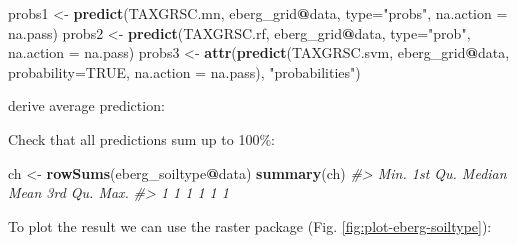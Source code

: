 \documentclass[graybox,natbib,nospthms,UStrade]{svmono}
\newenvironment{Shaded}{\begin{snugshade}}{\end{snugshade}}
\newcommand{\CommentTok}[1]{\textcolor[rgb]{0.37,0.37,0.37}{\textit{#1}}}
\newcommand{\DataTypeTok}[1]{\textcolor[rgb]{0.27,0.27,0.27}{#1}}
\newcommand{\KeywordTok}[1]{\textcolor[rgb]{0.27,0.27,0.27}{\textbf{#1}}}
\newcommand{\NormalTok}[1]{#1}
\newcommand{\OperatorTok}[1]{\textcolor[rgb]{0.43,0.43,0.43}{\textbf{#1}}}
\newcommand{\OtherTok}[1]{\textcolor[rgb]{0.37,0.37,0.37}{#1}}
\newcommand{\StringTok}[1]{\textcolor[rgb]{0.5,0.5,0.5}{#1}}
\begin{document}
\begin{Shaded}
\begin{Highlighting}[]
\NormalTok{probs1 <-}\StringTok{ }\KeywordTok{predict}\NormalTok{(TAXGRSC.mn, eberg_grid}\OperatorTok{@}\NormalTok{data, }\DataTypeTok{type=}\StringTok{"probs"}\NormalTok{, }\DataTypeTok{na.action =}\NormalTok{ na.pass) }
\NormalTok{probs2 <-}\StringTok{ }\KeywordTok{predict}\NormalTok{(TAXGRSC.rf, eberg_grid}\OperatorTok{@}\NormalTok{data, }\DataTypeTok{type=}\StringTok{"prob"}\NormalTok{, }\DataTypeTok{na.action =}\NormalTok{ na.pass)}
\NormalTok{probs3 <-}\StringTok{ }\KeywordTok{attr}\NormalTok{(}\KeywordTok{predict}\NormalTok{(TAXGRSC.svm, eberg_grid}\OperatorTok{@}\NormalTok{data, }
                       \DataTypeTok{probability=}\OtherTok{TRUE}\NormalTok{, }\DataTypeTok{na.action =}\NormalTok{ na.pass), }\StringTok{"probabilities"}\NormalTok{)}
\end{Highlighting}
\end{Shaded}

derive average prediction:

\begin{Shaded}
\end{Shaded}

Check that all predictions sum up to 100\%:

\begin{Shaded}
\begin{Highlighting}[]
\NormalTok{ch <-}\StringTok{ }\KeywordTok{rowSums}\NormalTok{(eberg_soiltype}\OperatorTok{@}\NormalTok{data)}
\KeywordTok{summary}\NormalTok{(ch)}
\CommentTok{#>    Min. 1st Qu.  Median    Mean 3rd Qu.    Max. }
\CommentTok{#>       1       1       1       1       1       1}
\end{Highlighting}
\end{Shaded}

To plot the result we can use the raster package (Fig. \ref{fig:plot-eberg-soiltype}):
\end{document}
